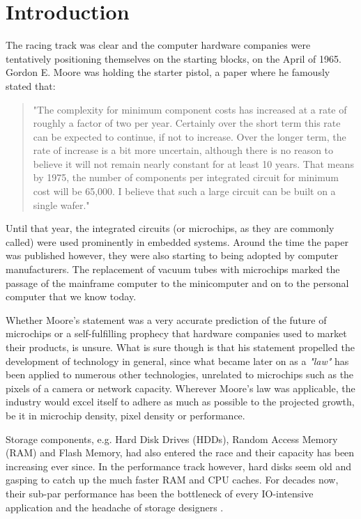 \chapter{Introduction}\label{ch:intro}

The racing track was clear and the computer hardware companies were tentatively 
positioning themselves on the starting blocks, on the April of 1965. Gordon E.  
Moore was holding the starter pistol, a paper where he famously stated that:

\begin{quotation}
	"The complexity for minimum component costs has increased at a rate of 
	roughly a factor of two per year. Certainly over the short term this rate 
	can be expected to continue, if not to increase. Over the longer term, the 
	rate of increase is a bit more uncertain, although there is no reason to 
	believe it will not remain nearly constant for at least 10 years. That 
	means by 1975, the number of components per integrated circuit for minimum 
	cost will be 65,000. I believe that such a large circuit can be built on a 
	single wafer."\cite{Moore}
\end{quotation}

Until that year, the integrated circuits (or microchips, as they are commonly 
called) were used prominently in embedded systems. Around the time the paper 
was published however, they were also starting to being adopted by computer 
manufacturers. The replacement of vacuum tubes with microchips marked the 
passage of the mainframe computer to the minicomputer and on to the personal 
computer that we know today.

Whether Moore's statement was a very accurate prediction of the future of 
microchips or a self-fulfilling prophecy that hardware companies used to market 
their products, is unsure. What is sure though is that his statement propelled 
the development of technology in general, since what became later on as a 
\textit{"law"} has been applied to numerous other technologies, unrelated to 
microchips such as the pixels of a camera or network capacity.  Wherever 
Moore's law was applicable, the industry would excel itself to adhere as much 
as possible to the projected growth, be it in microchip density, pixel density 
or performance.

Storage components, e.g. Hard Disk Drives (HDDs), Random Access Memory (RAM) 
and Flash Memory, had also entered the race and their capacity has been 
increasing ever since. In the performance track however, hard disks seem old 
and gasping to catch up the much faster RAM and CPU caches. For decades now, 
their sub-par performance has been the bottleneck of every IO-intensive 
application and the headache of storage designers \cite{nvm}.

